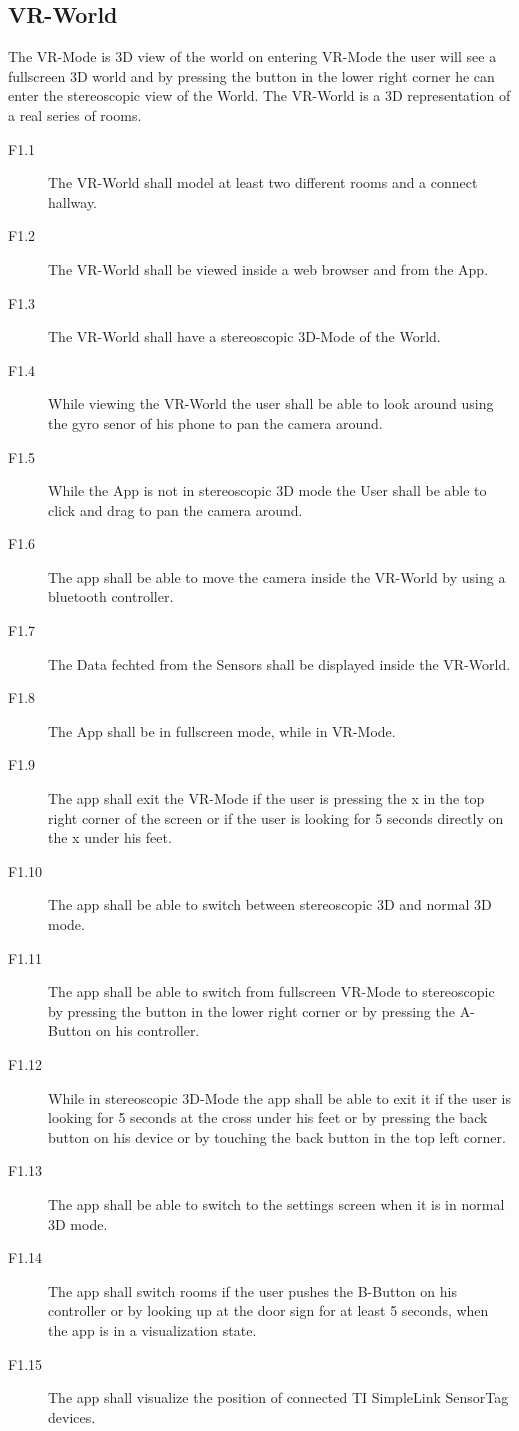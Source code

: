 \subsection{VR-World}
  The VR-Mode is 3D view of the world on entering VR-Mode the user will see a fullscreen 3D world and by pressing the button in the lower right corner he can enter the  stereoscopic view of the World.
  The VR-World is a 3D representation of a real series of rooms.
  \begin{description}
    \item[F1.1] The VR-World shall model at least two different rooms and a connect hallway.
    \item[F1.2] The VR-World shall be viewed inside a web browser and from the App.
    \item[F1.3] The VR-World shall have a stereoscopic 3D-Mode of the World.
    \item[F1.4] While viewing the VR-World the user shall be able to look around using the gyro senor of his phone to pan the camera around.
    \item[F1.5] While the App is not in stereoscopic 3D mode the User shall be able to click and drag to pan the camera around.
    \item[F1.6] The app shall be able to move the camera inside the VR-World by using a bluetooth controller.
    \item[F1.7] The Data fechted from the Sensors shall be displayed inside the VR-World.
    \item[F1.8] The App shall be in fullscreen mode, while in VR-Mode.
    \item[F1.9] The app shall exit the VR-Mode if the user is pressing the x in the top right corner of the screen or if the user is looking for 5 seconds directly on the x under his feet.
    \item[F1.10] The app shall be able to switch between stereoscopic 3D and normal 3D mode.
    \item[F1.11] The app shall be able to switch from fullscreen VR-Mode to stereoscopic by pressing the button in the lower right corner or by pressing the A-Button on his controller.
    \item[F1.12] While in stereoscopic 3D-Mode the app shall be able to exit it if the user is looking for 5 seconds at the cross under his feet or by pressing the back button on his device or by touching the back button in the top left corner.
    \item[F1.13] The app shall be able to switch to the settings screen when it is in normal 3D mode.
    \item[F1.14] The app shall switch rooms if the user pushes the B-Button on his controller or by looking up at the door sign for at least 5 seconds, when the app is in a visualization state.
    \item[F1.15] The app shall visualize the position of connected TI SimpleLink SensorTag devices.
  \end{description}


